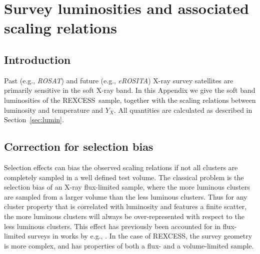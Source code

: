 \documentclass[oldversion]{aa}
\newcommand{\rexcess}{{\gwpfont REXCESS}}
\begin{document}

\section{Survey luminosities and associated scaling relations}
\label{sec:surveylx}

\subsection{Introduction}

Past (e.g., {\it ROSAT}) and future (e.g., {\it eROSITA}) X-ray survey satellites are primarily sensitive in the soft X-ray band. In this Appendix we give the soft band luminosities of the \rexcess\ sample, together with the scaling relations between luminosity and temperature and $Y_X$. All quantities are calculated as described in Section~\ref{sec:lumin}.

\subsection{Correction for selection bias}

Selection effects can bias the observed scaling relations if not 
all clusters are completely sampled in
a well defined test volume. The classical problem is the selection
bias of an X-ray flux-limited sample, where the more luminous clusters
are sampled from a larger volume than the less luminous clusters. Thus for
any cluster property that is correlated with luminosity and features a
finite scatter, the more luminous clusters 
will always be over-represented with respect to the less luminous clusters. This
effect has previously been accounted for in flux-limited surveys in works by e.g., \citet[][]{ikebe02,stanek06,pacaud07,vikh08}.
In the case of \rexcess, the survey geometry is more complex, and has properties of both a flux- and a volume-limited sample. 
\end{document}
